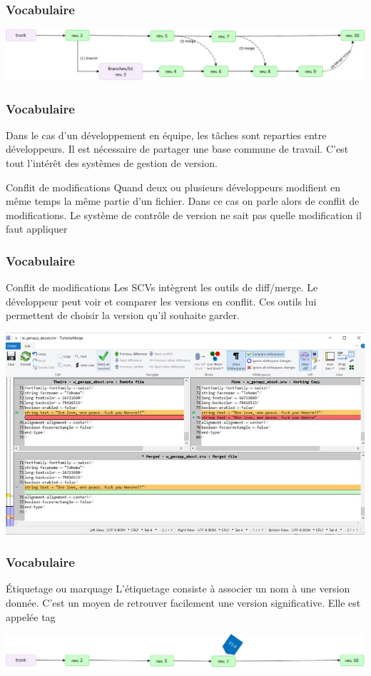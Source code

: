 \documentclass{beamer}
\begin{document}
\begin{frame}
\frametitle{Vocabulaire}
\includegraphics[width=\textwidth]{../images/branche.jpg}\\
\end{frame}

\begin{frame}
\frametitle{Vocabulaire}
Dans le cas d'un développement en équipe, les tâches sont reparties entre développeurs. Il est nécessaire de partager une base commune de travail. C'est tout l'intérêt des systèmes de gestion de version.
\begin{block}{Conflit de modifications}
 Quand deux ou plusieurs développeurs modifient en même temps la  même partie d'un fichier. Dans ce cas on parle alors de \alert{conflit de modifications}. Le système de contrôle de version ne sait pas quelle modification il faut appliquer
\end{block}
\end{frame}

\begin{frame}
\frametitle{Vocabulaire}
\begin{block}{Conflit de modifications}
Les SCVs  intègrent les outils de \alert{diff/merge}. Le développeur peut voir et comparer les versions en conflit. Ces outils lui permettent de choisir la version qu'il souhaite garder.
\end{block}
 \includegraphics[scale=.5]{../images/changement.jpg}

\end{frame}
\begin{frame}
\frametitle{Vocabulaire}
\begin{block}{Étiquetage ou marquage}
L'étiquetage consiste à associer un nom à une version donnée. C'est un moyen de retrouver facilement une version significative. Elle est appelée \alert{tag}
\end{block}
 \includegraphics[scale=0.5]{../images/etiquetage.jpg}
\end{frame}
\end{document}
